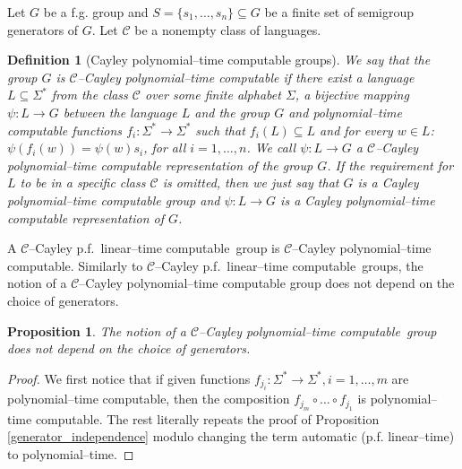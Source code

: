 \documentclass[article,12pt]{elsarticle}
\newtheorem{definition}{Definition}
\newtheorem{proposition}{Proposition}
\newcommand\ClinearC{$\mathcal{C}$--Cayley p.f.~linear--time computable}
\newcommand\CpolyC{$\mathcal{C}$--Cayley polynomial--time computable}
\begin{document}
Let $G$ be a f.g. group 
and $S= \{s_1, \dots, s_n \} \subseteq G$ be 
a finite set of semigroup generators of $G$. 
Let  $\mathcal{C}$ be a nonempty class of 
languages. 
\begin{definition}[Cayley polynomial--time computable groups] 
	\label{definition_Cayley_polynomial}	
	We say that the group $G$ is 
	$\mathcal{C}$--Cayley polynomial--time  
	computable if there exist a language  
	$L \subseteq \Sigma^*$ from the class 
	$\mathcal{C}$ over some finite alphabet 
	$\Sigma$, a bijective mapping 
	$\psi : L \rightarrow  G$ between the 
	language $L$ and the group $G$ 
	and polynomial--time computable  
	functions 
	$f_i : \Sigma ^* \rightarrow \Sigma^*$ 
	such that $f_i (L) \subseteq L$ and for 
	every $w \in L$: 
	$   \psi (f_i (w)) = \psi(w) s_i$,    
	for all $i=1,\dots,n$. We call 
	$\psi : L \rightarrow G$ a 
	$\mathcal{C}$--Cayley polynomial--time 
	computable representation of the group 
	$G$. If the requirement for $L$ to be 
	in a specific class $\mathcal{C}$ is omitted, 
	then we just say that $G$ is a Cayley 
	polynomial--time computable group and
	$\psi: L \rightarrow G$ is a Cayley 
	polynomial--time computable representation 
	of $G$.  
\end{definition}  
A \ClinearC\ group is \CpolyC.   
Similarly to \ClinearC\ 
groups, the notion of a $\mathcal{C}$--Cayley 
polynomial--time computable group does not depend
on the choice of generators.  
\begin{proposition} 
	\label{ind_choice_gen_caylepol}	 
	The notion of a \CpolyC\ 
	group does not depend on the choice 
	of generators. 	
\end{proposition}	
\begin{proof} 
	We first notice that if given functions 
	$f_{j_i}: \Sigma^* \rightarrow \Sigma^*, i=1,\dots,m$ 
	are polynomial--time computable, then the 
	composition $f_{j_m} \circ \dots \circ f_{j_1}$ 
	is polynomial--time computable.
	The rest literally repeats 
	the proof of Proposition \ref{generator_independence} 
	modulo changing the term automatic 
	(p.f. linear--time) 
    to polynomial--time.  
\end{proof}	
\end{document}
